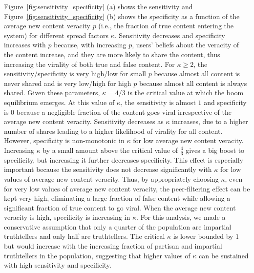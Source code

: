 Figure~\ref{fig:sensitivity_specificity} (a) shows the sensitivity and Figure~\ref{fig:sensitivity_specificity} (b) shows the specificity as a function of the average new content veracity $p$ (i.e., the fraction of true content entering the system) for different spread factors $\kappa$. Sensitivity decreases and specificity increases with $p$ because, with increasing $p$, users' beliefs about the veracity of the content increase, and they are more likely to share the content, thus increasing the virality of both true and false content. For $\kappa \geq 2$, the sensitivity/specificity is very high/low for small $p$ because almost all content is never shared and is very low/high for high $p$ because almost all content is always shared. Given these parameters, $\kappa = 4/3$ is the critical value at which the boom equilibrium emerges. At this value of $\kappa$, the sensitivity is almost $1$ and specificity is $0$ because a negligible fraction of the content goes viral irrespective of the average new content veracity. Sensitivity decreases as $\kappa$ increases, due to a higher number of shares leading to a higher likelihood of virality for all content. However, specificity is non-monotonic in $\kappa$ for low average new content veracity. Increasing $\kappa$ by a small amount above the critical value of $\frac{4}{3}$ gives a big boost to specificity, but increasing it further decreases specificity. This effect is especially important because the sensitivity does not decrease significantly with $\kappa$ for low values of average new content veracity. Thus, by appropriately choosing $\kappa$, even for very low values of average new content veracity, the peer-filtering effect can be kept very high, eliminating a large fraction of false content while allowing a significant fraction of true content to go viral. When the average new content veracity is high, specificity is increasing in $\kappa$. For this analysis, we made a conservative assumption that only a quarter of the population are impartial truthtellers and only half are truthtellers. The critical $\kappa$ is lower bounded by $1$ but would increase with the increasing fraction of partisan and impartial truthtellers in the population, suggesting that higher values of $\kappa$ can be sustained with high sensitivity and specificity.





